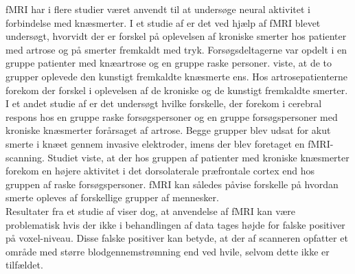 fMRI har i flere studier været anvendt til at undersøge neural aktivitet i forbindelse med knæsmerter.
I et studie af  er det ved hjælp af fMRI blevet undersøgt, hvorvidt der er forskel på oplevelsen af kroniske smerter hos patienter med artrose og på smerter fremkaldt med tryk. Forsøgsdeltagerne var opdelt i en gruppe patienter med knæartrose og en gruppe raske personer.  viste, at de to grupper oplevede den kunstigt fremkaldte knæsmerte ens. Hos artrosepatienterne forekom der forskel i oplevelsen af de kroniske og de kunstigt fremkaldte smerter. \citep{Parks2012}\\ 
I et andet studie af  er det undersøgt hvilke forskelle, der forekom i cerebral respons hos en gruppe raske forsøgspersoner og en gruppe forsøgspersoner med kroniske knæsmerter forårsaget af artrose. Begge grupper blev udsat for akut smerte i knæet gennem invasive elektroder, imens der blev foretaget en fMRI-scanning. Studiet viste, at der hos gruppen af patienter med kroniske knæsmerter forekom en højere aktivitet i det dorsolaterale præfrontale cortex end hos gruppen af raske forsøgspersoner. \citep{Hiramatsu2014}
fMRI kan således påvise forskelle på hvordan smerte opleves af forskellige grupper af mennesker. \\
Resultater fra et studie af  viser dog, at anvendelse af fMRI kan være problematisk hvis der ikke i behandlingen af data tages højde for falske positiver på voxel-niveau. Disse falske positiver kan betyde, at der af scanneren opfatter et område med større blodgennemstrømning end ved hvile, selvom dette ikke er tilfældet. \citep{Bennet2011} 

